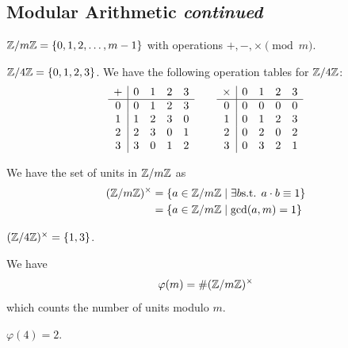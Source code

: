 \subsection{Modular Arithmetic \emph{continued}}
\begin{definition}
    $\mathbb Z/m\mathbb Z = \{0, 1, 2, \dots, m-1\}$ with operations $+, -, \times \pmod{m}$.
\end{definition}
\begin{example}
    $\mathbb Z/4\mathbb Z = \{0, 1, 2, 3\}$. We have the following operation tables for $\mathbb Z/4\mathbb Z$:
    \[\begin{array}[]{c|cccc}
            + & 0 & 1 & 2 & 3 \\ \hline
            0 & 0 & 1 & 2 & 3 \\
            1 & 1 & 2 & 3 & 0 \\
            2 & 2 & 3 & 0 & 1 \\
            3 & 3 & 0 & 1 & 2 \\
        \end{array}\qquad
        \begin{array}[]{c|cccc}
            \times & 0 & 1 & 2 & 3 \\ \hline
            0      & 0 & 0 & 0 & 0 \\
            1      & 0 & 1 & 2 & 3 \\
            2      & 0 & 2 & 0 & 2 \\
            3      & 0 & 3 & 2 & 1 \\
        \end{array}\]
\end{example}

\begin{definition}
    We have the set of units in $\mathbb Z/m\mathbb Z$ as
    \begin{align*}
        (\mathbb Z/m\mathbb Z)^\times & = \{a\in \mathbb Z/m\mathbb Z\mid \exists b \text{s.t. }a\cdot b \equiv 1\} \\
                          & = \{a\in \mathbb Z/m\mathbb Z\mid \gcd(a, m) = 1\}
    \end{align*}
\end{definition}
\begin{example}
    $(\mathbb Z/4\mathbb Z)^\times = \{1, 3\}$.
\end{example}

\begin{definition}
    We have
    \begin{equation*}
        \varphi(m) = \# (\mathbb Z/m\mathbb Z)^\times
    \end{equation*}
    which counts the number of units modulo $m$.
\end{definition}
\begin{example}
    $\varphi(4) = 2$.
\end{example}

